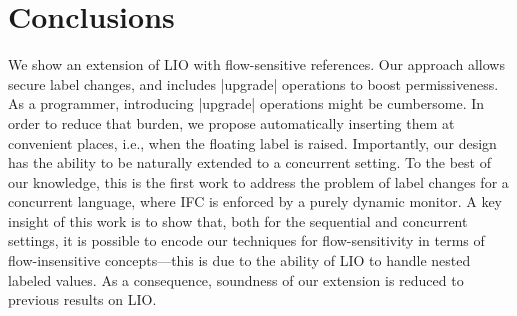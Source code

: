 \section{Conclusions}
\label{sec:conclusion}

We show an extension of LIO with flow-sensitive references. Our approach allows
secure label changes, and includes |upgrade| operations to boost
permissiveness. As a programmer, introducing |upgrade| operations might be
cumbersome. In order to reduce that burden, we propose automatically inserting
them at convenient places, i.e., when the floating label is raised.
Importantly, our design has the ability to be naturally extended to a
concurrent setting.  To the best of our knowledge, this is the first work to
address the problem of label changes for a concurrent language, where IFC is
enforced by a purely dynamic monitor.  A key insight of this work is to show
that, both for the sequential and concurrent settings, it is possible to encode
our techniques for flow-sensitivity in terms of flow-insensitive
concepts---this is due to the ability of LIO to handle nested labeled values.
As a consequence, soundness of our extension is reduced to previous results on
LIO.



